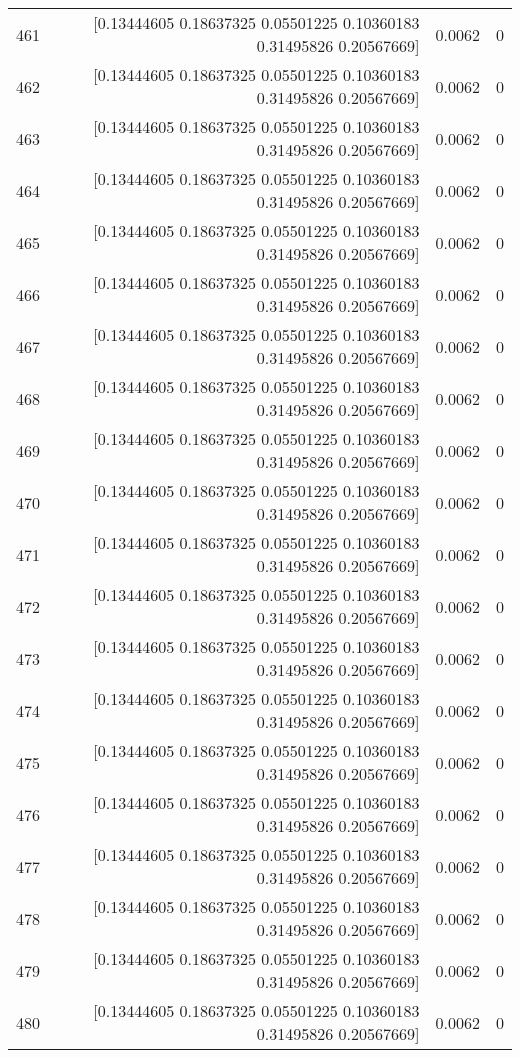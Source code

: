 \begin{longtable}{lrrr}
461 & [0.13444605 0.18637325 0.05501225 0.10360183 0.31495826 0.20567669] & 0.0062 & 0 \\
462 & [0.13444605 0.18637325 0.05501225 0.10360183 0.31495826 0.20567669] & 0.0062 & 0 \\
463 & [0.13444605 0.18637325 0.05501225 0.10360183 0.31495826 0.20567669] & 0.0062 & 0 \\
464 & [0.13444605 0.18637325 0.05501225 0.10360183 0.31495826 0.20567669] & 0.0062 & 0 \\
465 & [0.13444605 0.18637325 0.05501225 0.10360183 0.31495826 0.20567669] & 0.0062 & 0 \\
466 & [0.13444605 0.18637325 0.05501225 0.10360183 0.31495826 0.20567669] & 0.0062 & 0 \\
467 & [0.13444605 0.18637325 0.05501225 0.10360183 0.31495826 0.20567669] & 0.0062 & 0 \\
468 & [0.13444605 0.18637325 0.05501225 0.10360183 0.31495826 0.20567669] & 0.0062 & 0 \\
469 & [0.13444605 0.18637325 0.05501225 0.10360183 0.31495826 0.20567669] & 0.0062 & 0 \\
470 & [0.13444605 0.18637325 0.05501225 0.10360183 0.31495826 0.20567669] & 0.0062 & 0 \\
471 & [0.13444605 0.18637325 0.05501225 0.10360183 0.31495826 0.20567669] & 0.0062 & 0 \\
472 & [0.13444605 0.18637325 0.05501225 0.10360183 0.31495826 0.20567669] & 0.0062 & 0 \\
473 & [0.13444605 0.18637325 0.05501225 0.10360183 0.31495826 0.20567669] & 0.0062 & 0 \\
474 & [0.13444605 0.18637325 0.05501225 0.10360183 0.31495826 0.20567669] & 0.0062 & 0 \\
475 & [0.13444605 0.18637325 0.05501225 0.10360183 0.31495826 0.20567669] & 0.0062 & 0 \\
476 & [0.13444605 0.18637325 0.05501225 0.10360183 0.31495826 0.20567669] & 0.0062 & 0 \\
477 & [0.13444605 0.18637325 0.05501225 0.10360183 0.31495826 0.20567669] & 0.0062 & 0 \\
478 & [0.13444605 0.18637325 0.05501225 0.10360183 0.31495826 0.20567669] & 0.0062 & 0 \\
479 & [0.13444605 0.18637325 0.05501225 0.10360183 0.31495826 0.20567669] & 0.0062 & 0 \\
480 & [0.13444605 0.18637325 0.05501225 0.10360183 0.31495826 0.20567669] & 0.0062 & 0 \\

\end{longtable}
